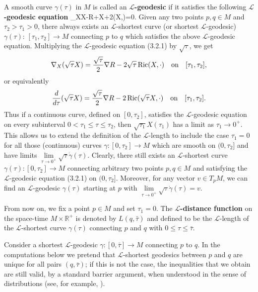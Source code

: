 A smooth curve $\gamma(\tau)$ in $M$ is called an {\bf
$\mathcal{L}$-geodesic}
if it satisfies the following {\bf $\mathcal{L}$-geodesic
equation} \be
\nabla_XX-\nabla R+X+2\Ric(X,\cdot)=0.
\ee Given any two points $p,q\in M$ and $\tau_2>\tau_1>0$, there
always exists an $\mathcal{L}$-shortest curve (or shortest
$\mathcal{L}$-geodesic) $\gamma(\tau)$:
$[\tau_1,\tau_2]\rightarrow M$ connecting $p$ to $q$ which
satisfies the above $\mathcal{L}$-geodesic equation. Multiplying
the $\mathcal{L}$-geodesic equation (3.2.1) by $\sqrt{\tau}$, we
get
$$
\nabla_X(\sqrt{\tau}X)=\frac{\sqrt{\tau}}{2}\nabla R
-2\sqrt{\tau}\operatorname{Ric}(X,\cdot)\quad \text{on}\quad [\tau_1,\tau_2],
$$
or equivalently
$$
\frac{d}{d\tau}(\sqrt{\tau}X)=\frac{\sqrt{\tau}}{2}\nabla R
-2\operatorname{Ric}(\sqrt{\tau}X,\cdot) \quad \text{on}\quad [\tau_1,\tau_2].
$$
Thus if a continuous curve, defined on $[0,\tau_2]$, satisfies the
$\mathcal{L}$-geodesic equation on every subinterval
$0<\tau_1\le\tau\le\tau_2$, then $\sqrt{\tau_1}X(\tau_1)$ has a
limit as $\tau_1\rightarrow 0^+$. This allows us to extend the
definition of the $\mathcal{L}$-length to include the case
$\tau_1=0$ for all those (continuous) curves $\gamma:
[0,\tau_2]\rightarrow M$ which are smooth on $(0,\tau_2]$ and have
limits
$\lim\limits_{\tau\rightarrow0^+}\sqrt{\tau}\dot{\gamma}(\tau)$.
Clearly, there still exists an $\mathcal{L}$-shortest curve
$\gamma(\tau):[0,\tau_2]\rightarrow M$ connecting arbitrary two
points $p,q\in M$ and satisfying the $\mathcal{L}$-geodesic
equation (3.2.1) on $(0,\tau_2]$. Moreover, for any vector $v \in
T_pM$, we can find an $\mathcal{L}$-geodesic $\gamma(\tau)$
starting at $p$ with
$\lim\limits_{\tau\rightarrow0^+}\sqrt{\tau}\dot{\gamma}(\tau)=v$.

{}From now on, we fix a point $p\in M$ and set $\tau_1=0$. The
{\bf $\mathcal{L}$-distance function} on the space-time $M\times \mathbb{R}^+$ is denoted by
$L(q,\bar{\tau})$ and defined to be the $\mathcal{L}$-length of
the $\mathcal{L}$-shortest curve $\gamma(\tau)$ connecting $p$ and
$q$ with $0\le\tau\le\bar{\tau}$.

Consider a shortest $\mathcal{L}$-geodesic $\gamma: [0,\bar \tau]
\rightarrow M$ connecting $p$ to $q$. In the computations below we
pretend that $\mathcal{L}$-shortest geodesics between $p$ and $q$
are unique for all pairs $(q,\bar \tau)$; if this is not the case,
the inequalities that we obtain are still valid, by a standard
barrier argument, when understood in the sense of distributions
(see, for example, \cite{ScY}).

